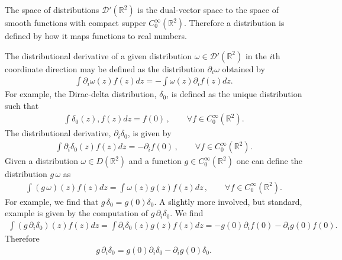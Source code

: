 \documentclass[12pt]{amsart}
\newcommand{\R}{\ensuremath{\mathbb{R}}}
\theoremstyle{remark}
\begin{document}
The space of distributions $\mathcal{D}'(\R^2)$ is the dual-vector space to the space of smooth functions with compact supper $C^\infty_0(\R^2)$.
Therefore a distribution is defined by how it maps functions to real numbers.

The distributional derivative of a given distribution $\omega \in \mathcal{D}'(\R^2)$ in the $i$th coordinate direction may be defined as the distribution $\partial_i \omega$ obtained by
\begin{align*}
	\int \partial_i \omega (z) f(z) dz = - \int \omega(z) \partial_i f (z) dz.
\end{align*}
For example, the Dirac-delta distribution, $\delta_0$, is defined as the unique distribution such that
\begin{align*}
	\int \delta_0(z) , f (z) dz = f(0) \,,\quad \quad \forall f \in C_0^\infty(\R^2).
\end{align*}
The distributional derivative, $\partial_i \delta_0$, is given by
\begin{align*}
	\int \partial_i \delta_0 (z) f(z) dz = -\partial_i f(0) \,,\quad \quad \forall f \in C_0^\infty(\R^2).
\end{align*}
Given a distribution $\omega \in D(\R^2)$ and a function $g \in C_0^\infty(\R^2)$ one can define the
distribution $g \, \omega$ as
\begin{align*}
	\int (g \, \omega)(z)  f(z) dz = \int \omega(z) g(z)f(z) dz \,,\quad \quad \forall f \in C_0^\infty(\R^2).
\end{align*}
For example, we find that $g \, \delta _0 = g(0) \delta_0$.
A slightly more involved, but standard,  example is given by the computation of $g\, \partial_i \delta_0$.
We find
\begin{align*}
	\int (g \, \partial_i \delta_0) (z)  f(z) dz = \int \partial_i \delta_0(z) g(z)f(z) dz =  - g(0) \partial_i f(0) - \partial_ig(0) f(0).
\end{align*}
Therefore
\begin{align*}
	g \, \partial_i \delta_0 = g(0) \partial_i \delta_0 - \partial_i g(0) \delta_0.
\end{align*}
\end{document}
